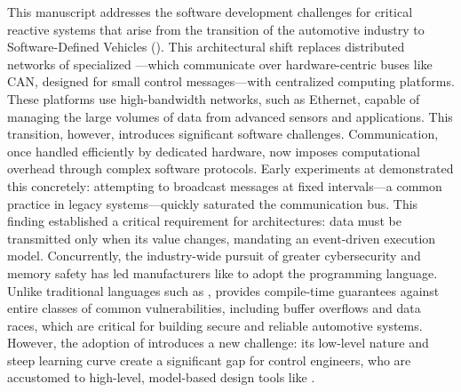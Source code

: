 This manuscript addresses the software development challenges for critical reactive systems that
arise from the transition of the automotive industry to Software-Defined Vehicles (\sdv). This
architectural shift replaces distributed networks of specialized \ecus---which communicate over
hardware-centric buses like CAN, designed for small control messages---with centralized computing
platforms. These platforms use high-bandwidth networks, such as Ethernet, capable of managing the
large volumes of data from advanced sensors and applications.
%
This transition, however, introduces significant software challenges. Communication, once handled
efficiently by dedicated hardware, now imposes computational overhead through complex software
protocols. Early experiments at \ampere demonstrated this concretely: attempting to broadcast
messages at fixed intervals---a common practice in legacy systems---quickly saturated the
communication bus. This finding established a critical requirement for \sdv architectures: data must
be transmitted only when its value changes, mandating an event-driven execution model.
%
Concurrently, the industry-wide pursuit of greater cybersecurity and memory safety has led
manufacturers like \ampere to adopt the \Rust programming language. Unlike traditional languages
such as \Ci, \Rust provides compile-time guarantees against entire classes of common
vulnerabilities, including buffer overflows and data races, which are critical for building secure
and reliable automotive systems.
%
However, the adoption of \Rust introduces a new challenge: its low-level nature and steep learning
curve create a significant gap for control engineers, who are accustomed to high-level, model-based
design tools like \Simulink.

